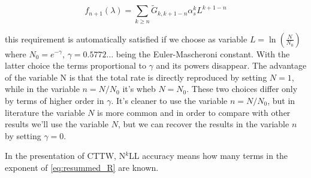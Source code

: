 \documentclass[../main.tex]{subfiles}
\begin{document}
\begin{equation}
    f_{n+1}(\lambda) = \sum_{k \ge n} \tilde{G}_{k,k+1-n} \alpha_s^k L^{k+1-n}
\end{equation}

this requirement is automatically satisfied if we choose as variable $L = \ln(\frac{N}{N_0})$ where $N_0 = e^{-\gamma}$, $\gamma = 0.5772 \dots $ being the Euler-Mascheroni constant.
With the latter choice the terms proportional to $\gamma$ and its powers disappear. The advantage of the variable N is that the total rate is directly reproduced by setting $N=1$, while
in the variable $n=N/N_0$ it's wheb $N=N_0$. These two choices differ only by terms of higher order in $\gamma$.
It's cleaner to use the variable $n=N/N_0$, but in literature the variable $N$ is more common and in order to compare with other results we'll use the variable $N$,
but we can recover the results in the variable $n$ by setting $\gamma = 0$.

In the presentation of CTTW, N$^k$LL accuracy means how many terms in the exponent of \cref{eq:resummed_R} are known.
\end{document}
